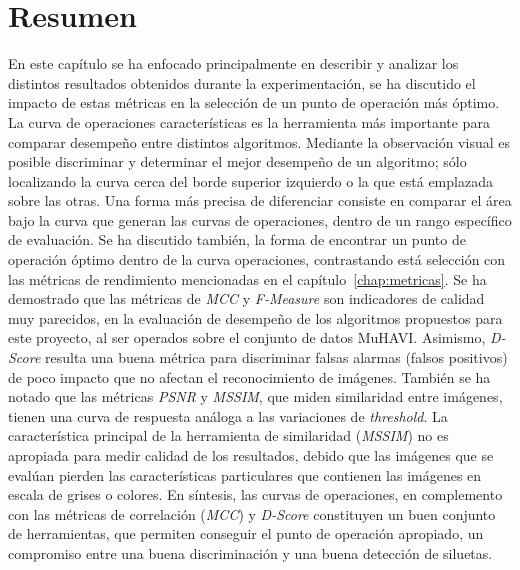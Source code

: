 

\newpage
\section{Resumen}

En este capítulo se ha enfocado principalmente en describir y analizar los distintos resultados obtenidos durante la experimentación, se ha discutido el impacto de estas métricas en la selección de un punto de operación más óptimo. La curva de operaciones características es la herramienta más importante para comparar desempeño entre distintos algoritmos. Mediante la observación visual es posible discriminar y determinar el mejor desempeño de un algoritmo; sólo localizando la curva cerca del borde superior izquierdo o la que está emplazada sobre las otras. Una forma más precisa de diferenciar consiste en comparar el área bajo la curva que generan las curvas de operaciones, dentro de un rango específico de evaluación. Se ha discutido también, la forma de encontrar un punto de operación óptimo dentro de la curva operaciones, contrastando está selección con las métricas de rendimiento mencionadas en el capítulo~\ref{chap:metricas}. Se ha demostrado que las métricas de \textit{MCC} y \textit{F-Measure} son indicadores de calidad muy parecidos, en la evaluación de desempeño de los algoritmos propuestos para este proyecto, al ser operados sobre el conjunto de datos MuHAVI. Asimismo, \textit{D-Score} resulta una buena métrica para discriminar falsas alarmas (falsos positivos) de poco impacto que no afectan el reconocimiento de imágenes. También se ha notado que las métricas \textit{PSNR} y \textit{MSSIM}, que miden similaridad entre imágenes, tienen una curva de respuesta análoga a las variaciones de \textit{threshold}. La característica principal de la herramienta de similaridad (\textit{MSSIM}) no es apropiada para medir calidad de los resultados, debido que las imágenes que se evalúan pierden las características particulares que contienen las imágenes en escala de grises o colores. En síntesis, las curvas de operaciones, en complemento con las métricas de correlación (\textit{MCC}) y \textit{D-Score} constituyen un buen conjunto de herramientas, que permiten conseguir el punto de operación apropiado,  un compromiso entre una buena discriminación y una buena detección de siluetas.


